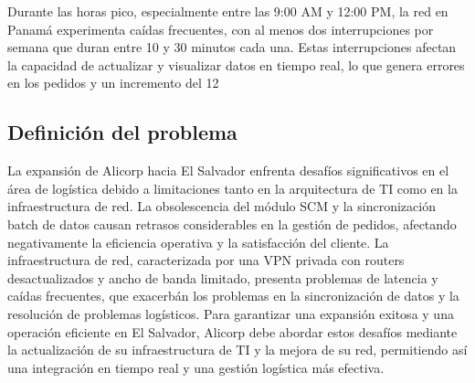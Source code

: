 Durante las horas pico, especialmente entre las 9:00 AM y 12:00 PM, la red en Panamá experimenta caídas frecuentes, con al menos dos interrupciones por semana que duran entre 10 y 30 minutos cada una. Estas interrupciones afectan la capacidad de actualizar y visualizar datos en tiempo real, lo que genera errores en los pedidos y un incremento del 12%
\subsection{Definición del problema}

La expansión de Alicorp hacia El Salvador enfrenta desafíos significativos en el área de logística debido a limitaciones tanto en la arquitectura de TI como en la infraestructura de red. La obsolescencia del módulo SCM y la sincronización batch de datos causan retrasos considerables en la gestión de pedidos, afectando negativamente la eficiencia operativa y la satisfacción del cliente. La infraestructura de red, caracterizada por una VPN privada con routers desactualizados y ancho de banda limitado, presenta problemas de latencia y caídas frecuentes, que exacerbán los problemas en la sincronización de datos y la resolución de problemas logísticos. Para garantizar una expansión exitosa y una operación eficiente en El Salvador, Alicorp debe abordar estos desafíos mediante la actualización de su infraestructura de TI y la mejora de su red, permitiendo así una integración en tiempo real y una gestión logística más efectiva.